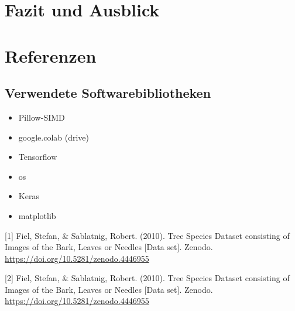 \documentclass{article}
\begin{document}
\FloatBarrier

\section{Fazit und Ausblick}


\section*{Referenzen}
\subsection*{Verwendete Softwarebibliotheken}
\begin{itemize}
\item Pillow-SIMD
\item google.colab (drive)
\item Tensorflow
\item os
\item Keras
\item matplotlib
\end{itemize}

\medskip
\small
[1] Fiel, Stefan, \& Sablatnig, Robert. (2010). Tree Species Dataset consisting of Images of the Bark, Leaves or Needles [Data set]. Zenodo. \url{https://doi.org/10.5281/zenodo.4446955}

[2] Fiel, Stefan, \& Sablatnig, Robert. (2010). Tree Species Dataset consisting of Images of the Bark, Leaves or Needles [Data set]. Zenodo. \url{https://doi.org/10.5281/zenodo.4446955}
\end{document}
